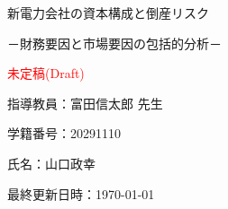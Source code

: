 \begin{titlepage}
\centering

\vspace*{5\baselineskip}

{\Large 新電力会社の資本構成と倒産リスク\par}
{\large －財務要因と市場要因の包括的分析－\par}

{\large \textcolor{red}{未定稿(Draft)}\par}


\vspace{15mm}

{\large 指導教員：富田信太郎 先生\par}

\vspace{60mm}

{\large 学籍番号：20291110\par}
{\large 氏名：山口政幸\par}
{\large 最終更新日時：\today\ \thistime}


\end{titlepage}

